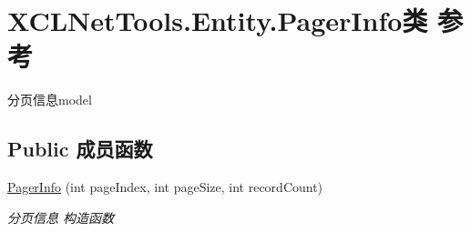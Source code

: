 \hypertarget{class_x_c_l_net_tools_1_1_entity_1_1_pager_info}{\section{X\-C\-L\-Net\-Tools.\-Entity.\-Pager\-Info类 参考}
\label{class_x_c_l_net_tools_1_1_entity_1_1_pager_info}
}


分页信息model  


\subsection*{Public 成员函数}
\begin{DoxyCompactItemize}
\item 
\hyperlink{class_x_c_l_net_tools_1_1_entity_1_1_pager_info_a942f7268d84ce1d1533b678acb7104c6}{Pager\-Info} (int page\-Index, int page\-Size, int record\-Count)
\begin{DoxyCompactList}\small\item\em 分页信息 构造函数 \end{DoxyCompactList}\end{DoxyCompactItemize}
